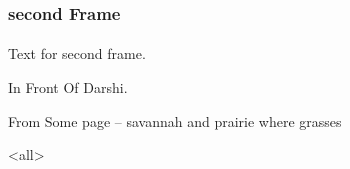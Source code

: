 \begin{comment}
*****  [[elisp:(org-cycle)][| ]]  [[elisp:(blee:ppmm:org-mode-toggle)][Nat]] [[elisp:(beginning-of-buffer)][Top]] [[elisp:(delete-other-windows)][(1)]] || /Frame/  second Frame ::  [[elisp:(org-cycle)][| ]]
\end{comment}

\begin{frame}[label=secondFrame]
    \frametitle{second Frame}
    \framesubtitle{}

Text for second frame.

In Front Of Darshi.

From Some page -- savannah and prairie where grasses 


\end{frame}


\mode<all>

\begin{comment}
*  [[elisp:(org-cycle)][| ]]  Local Vars  ::                  *Org-Mode And Emacs Specific Configurations*   [[elisp:(org-cycle)][| ]]
\end{comment}

